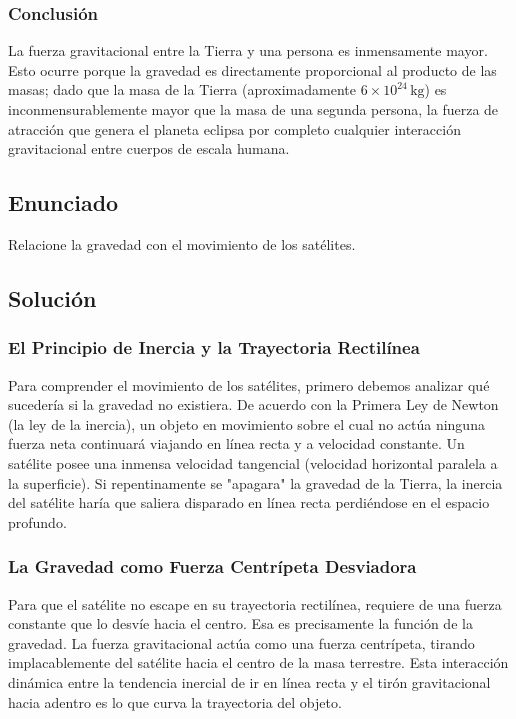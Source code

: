 \documentclass[12pt]{article}
\begin{document}
\subsubsection*{Conclusión}
La fuerza gravitacional entre la Tierra y una persona es inmensamente mayor. Esto ocurre porque la gravedad es directamente proporcional al producto de las masas; dado que la masa de la Tierra (aproximadamente $6 \times 10^{24} \, \text{kg}$) es inconmensurablemente mayor que la masa de una segunda persona, la fuerza de atracción que genera el planeta eclipsa por completo cualquier interacción gravitacional entre cuerpos de escala humana.

\newpage

\subsection*{Enunciado}
Relacione la gravedad con el movimiento de los satélites.

\subsection*{Solución}

\subsubsection*{El Principio de Inercia y la Trayectoria Rectilínea}
Para comprender el movimiento de los satélites, primero debemos analizar qué sucedería si la gravedad no existiera. De acuerdo con la Primera Ley de Newton (la ley de la inercia), un objeto en movimiento sobre el cual no actúa ninguna fuerza neta continuará viajando en línea recta y a velocidad constante. Un satélite posee una inmensa velocidad tangencial (velocidad horizontal paralela a la superficie). Si repentinamente se "apagara" la gravedad de la Tierra, la inercia del satélite haría que saliera disparado en línea recta perdiéndose en el espacio profundo.

\subsubsection*{La Gravedad como Fuerza Centrípeta Desviadora}
Para que el satélite no escape en su trayectoria rectilínea, requiere de una fuerza constante que lo desvíe hacia el centro. Esa es precisamente la función de la gravedad. La fuerza gravitacional actúa como una fuerza centrípeta, tirando implacablemente del satélite hacia el centro de la masa terrestre. Esta interacción dinámica entre la tendencia inercial de ir en línea recta y el tirón gravitacional hacia adentro es lo que curva la trayectoria del objeto.
\end{document}
